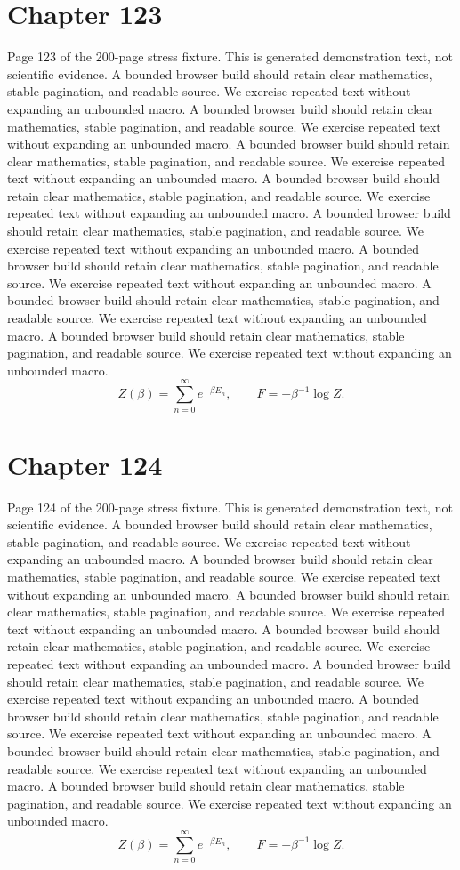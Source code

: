 \documentclass[11pt]{article}
\begin{document}
\section*{Chapter 123}
Page 123 of the 200-page stress fixture. This is generated demonstration text, not scientific evidence.
A bounded browser build should retain clear mathematics, stable pagination, and readable source. We exercise repeated text without expanding an unbounded macro.
A bounded browser build should retain clear mathematics, stable pagination, and readable source. We exercise repeated text without expanding an unbounded macro.
A bounded browser build should retain clear mathematics, stable pagination, and readable source. We exercise repeated text without expanding an unbounded macro.
A bounded browser build should retain clear mathematics, stable pagination, and readable source. We exercise repeated text without expanding an unbounded macro.
A bounded browser build should retain clear mathematics, stable pagination, and readable source. We exercise repeated text without expanding an unbounded macro.
A bounded browser build should retain clear mathematics, stable pagination, and readable source. We exercise repeated text without expanding an unbounded macro.
A bounded browser build should retain clear mathematics, stable pagination, and readable source. We exercise repeated text without expanding an unbounded macro.
A bounded browser build should retain clear mathematics, stable pagination, and readable source. We exercise repeated text without expanding an unbounded macro.
\[Z(\beta)=\sum_{n=0}^{\infty}e^{-\beta E_n},\qquad F=-\beta^{-1}\log Z.\]
\newpage
\section*{Chapter 124}
Page 124 of the 200-page stress fixture. This is generated demonstration text, not scientific evidence.
A bounded browser build should retain clear mathematics, stable pagination, and readable source. We exercise repeated text without expanding an unbounded macro.
A bounded browser build should retain clear mathematics, stable pagination, and readable source. We exercise repeated text without expanding an unbounded macro.
A bounded browser build should retain clear mathematics, stable pagination, and readable source. We exercise repeated text without expanding an unbounded macro.
A bounded browser build should retain clear mathematics, stable pagination, and readable source. We exercise repeated text without expanding an unbounded macro.
A bounded browser build should retain clear mathematics, stable pagination, and readable source. We exercise repeated text without expanding an unbounded macro.
A bounded browser build should retain clear mathematics, stable pagination, and readable source. We exercise repeated text without expanding an unbounded macro.
A bounded browser build should retain clear mathematics, stable pagination, and readable source. We exercise repeated text without expanding an unbounded macro.
A bounded browser build should retain clear mathematics, stable pagination, and readable source. We exercise repeated text without expanding an unbounded macro.
\[Z(\beta)=\sum_{n=0}^{\infty}e^{-\beta E_n},\qquad F=-\beta^{-1}\log Z.\]
\newpage
\end{document}
